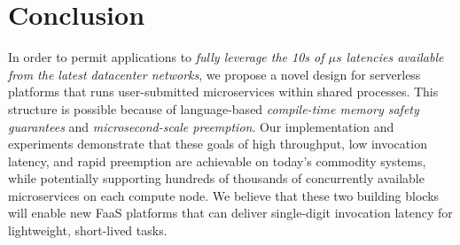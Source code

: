 \section{Conclusion}
\label{sec:concl}

In order to permit applications to \textit{fully leverage the 10s of $\mu{}s$
latencies available from the latest datacenter networks}, we propose a novel design
for serverless platforms that runs user-submitted microservices within shared
processes.  This structure is possible because of language-based
\textit{compile-time memory safety guarantees} and \textit{microsecond-scale
preemption}.  Our implementation and experiments demonstrate that these goals of
high throughput, low invocation latency, and rapid preemption are achievable
on today's commodity systems, while potentially supporting hundreds of thousands of
concurrently available microservices on each compute node.  We believe that these
two building blocks will enable new FaaS platforms that can deliver single-digit
invocation latency for lightweight, short-lived tasks.
